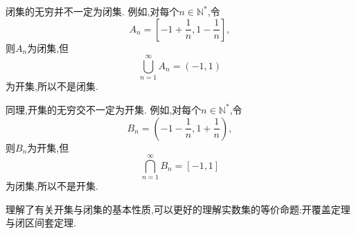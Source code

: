 \begin{example}
    闭集的无穷并不一定为闭集. 例如,对每个$n \in \mathbb{N}^*$,令$$A_n = \left[ -1 + \frac{1}{n}, 1 - \frac{1}{n} \right],$$则$A_n$为闭集,但$$\bigcup_{n=1}^{\infty} A_n = (-1,1)$$为开集,所以不是闭集.

    同理,开集的无穷交不一定为开集. 例如,对每个$n \in \mathbb{N}^*$,令$$B_n = \left( -1 - \frac{1}{n}, 1 + \frac{1}{n} \right),$$则$B_n$为开集,但$$\bigcap_{n=1}^{\infty} B_n = [-1,1]$$为闭集,所以不是开集.
\end{example}

理解了有关开集与闭集的基本性质,可以更好的理解实数集的等价命题:开覆盖定理与闭区间套定理.

